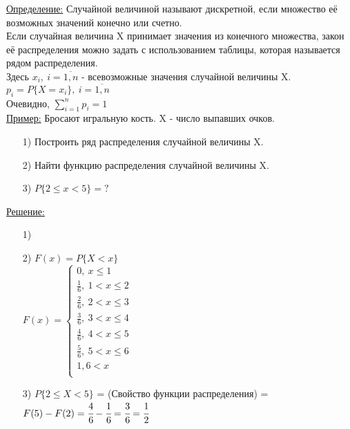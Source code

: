 
\underline{Определение:} Случайной величиной называют дискретной, если множество её возможных значений конечно или счетно. \\
Если случайная величина X принимает значения из конечного множества, закон её распределения можно задать с использованием таблицы, которая называется рядом распределения. \\
Здесь $x_i, \ i = \overline{1,n}$ - всевозможные значения случайной величины X. \\
$p_i = P\{X = x_i\}, \ i = \overline{1,n}$ \\
Очевидно, $\sum\limits_{i = 1}^{n} p_i = 1$ \\


\underline{Пример:} Бросают игральную кость. X - число выпавших очков.
\begin{enumerate}
\item[1)] Построить ряд распределения случайной величины X.
\item[2)] Найти функцию распределения случайной величины X.
\item[3)] $P\{2 \leqslant x < 5\} = ?$ 
\end{enumerate}
\underline{Решение:} \\
\begin{enumerate}
\item[1)] %

\item[2)] $F(x) = P\{X < x\}$ \\
$F(x) = 
\begin{cases} 
	0, \ x \leqslant 1 \\
	\frac{1}{6}, \ 1 < x \leqslant 2 \\
	\frac{2}{6}, \ 2 < x \leqslant 3 \\
	\frac{3}{6}, \ 3 < x \leqslant 4 \\
	\frac{4}{6}, \ 4 < x \leqslant 5 \\
	\frac{5}{6}, \ 5 < x \leqslant 6 \\
	1 , 6 < x \\
\end{cases}$

\item[3)] $P \{2 \leqslant X < 5\}$ = (Свойство функции распределения) = $F(5) - F(2) = \cfrac{4}{6} - \cfrac{1}{6} = \cfrac{3}{6} = \cfrac{1}{2}$
\end{enumerate}
